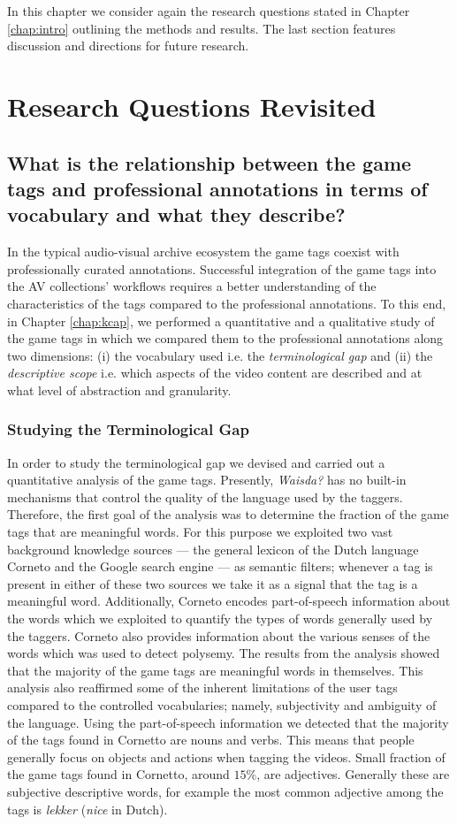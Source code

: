In this chapter we consider again the research questions stated in Chapter \ref{chap:intro} outlining the methods and results. The last section features discussion and directions for future research.

\section{Research Questions Revisited}
\subsection{What is the relationship between the game tags and professional annotations in terms of vocabulary and what they describe?}
In the typical audio-visual archive ecosystem the game tags coexist with professionally curated annotations.
Successful integration of the game tags into the AV collections' workflows requires a better understanding of the characteristics of the tags compared to the professional annotations. To this end, in Chapter \ref{chap:kcap}, we performed a quantitative and a qualitative study of the game tags in which we compared them to the professional annotations along two dimensions: (i) the vocabulary used i.e. the \textit{terminological gap} and (ii) the \textit{descriptive scope} i.e. which aspects of the video content are described and at what level of abstraction and granularity.

\subsubsection{Studying the Terminological Gap}
In order to study the terminological gap we devised and carried out a quantitative analysis of the game tags. 
Presently, \textit{Waisda?} has no built-in mechanisms that control the quality of the language used by the taggers. Therefore, the first goal of the analysis was to determine the fraction of the game tags that are meaningful words. For this purpose we exploited two vast background knowledge sources --- the general lexicon of the Dutch language Corneto and the Google search engine --- as semantic filters; whenever a tag is present in either of these two sources we take it as a signal that the tag is a meaningful word. Additionally, Corneto encodes part-of-speech information about the words which we exploited to quantify the types of words generally used by the taggers. Corneto also provides information about the various senses of the words which was used to detect polysemy. The results from the analysis showed that the majority of the game tags are meaningful words in themselves. This analysis also reaffirmed some of the inherent limitations of the user tags compared to the controlled vocabularies; namely, subjectivity and ambiguity of the language. Using the part-of-speech information we detected that the majority of the tags found in Cornetto are nouns and verbs. This means that people generally focus on objects and actions when tagging the videos. Small fraction of the game tags found in Cornetto, around $15\%$, are adjectives. Generally these are subjective descriptive words, for example the most common adjective among the tags is \textit{lekker} (\textit{nice} in Dutch).

